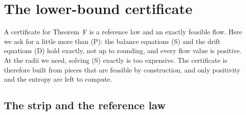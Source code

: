 \section{The lower-bound certificate}\label{sec:lower}

A certificate for Theorem~F is a reference law and an exactly feasible flow. Here we ask for a little more than (P):
the balance equations (S) and the drift equations (D) hold exactly, not up to rounding, and every flow value is
positive. At the radii we need, solving (S) exactly is too expensive. The certificate is therefore built from pieces
that are feasible by construction, and only positivity and the entropy are left to compute.

\subsection{The strip and the reference law}

